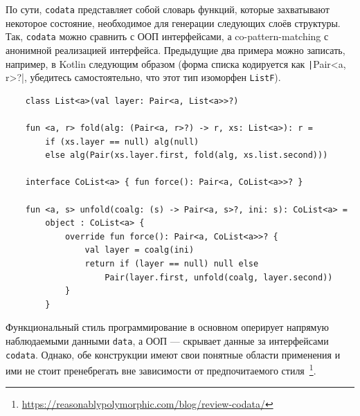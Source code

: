 По сути, \texttt{codata} представляет собой словарь функций, которые захватывают некоторое состояние, необходимое для генерации следующих слоёв структуры.
Так, \texttt{codata} можно сравнить с ООП интерфейсами, а co-pattern-matching с анонимной реализацией интерфейса.
Предыдущие два примера можно записать, например, в Kotlin следующим образом (форма списка кодируется как \texttt|Pair<a, r>?|, убедитесь самостоятельно, что этот тип изоморфен \texttt{ListF}).
\begin{verbatim}
    class List<a>(val layer: Pair<a, List<a>>?)

    fun <a, r> fold(alg: (Pair<a, r>?) -> r, xs: List<a>): r =
        if (xs.layer == null) alg(null)
        else alg(Pair(xs.layer.first, fold(alg, xs.list.second)))

    interface CoList<a> { fun force(): Pair<a, CoList<a>>? }

    fun <a, s> unfold(coalg: (s) -> Pair<a, s>?, ini: s): CoList<a> =
        object : CoList<a> {
            override fun force(): Pair<a, CoList<a>>? {
                val layer = coalg(ini)
                return if (layer == null) null else
                    Pair(layer.first, unfold(coalg, layer.second))
            }
        }
\end{verbatim}

Функциональный стиль программирование в основном оперирует напрямую наблюдаемыми данными \texttt{data}, а ООП --- скрывает данные за интерфейсами \texttt{codata}.
Однако, обе конструкции имеют свои понятные области применения и ими не стоит пренебрегать вне зависимости от предпочитаемого стиля~\cite{downen2019codata}\footnote{\url{https://reasonablypolymorphic.com/blog/review-codata/}}.





